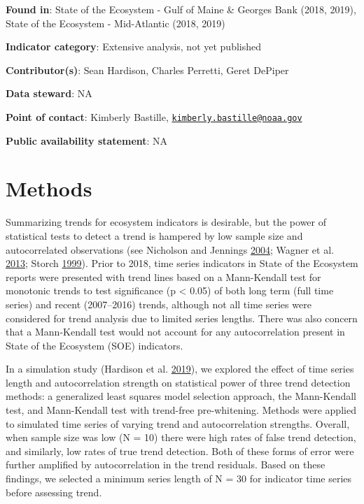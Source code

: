 \documentclass[
]{book}
\begin{document}
\textbf{Found in}: State of the Ecosystem - Gulf of Maine \& Georges Bank (2018, 2019), State of the Ecosystem - Mid-Atlantic (2018, 2019)

\textbf{Indicator category}: Extensive analysis, not yet published

\textbf{Contributor(s)}: Sean Hardison, Charles Perretti, Geret DePiper

\textbf{Data steward}: NA

\textbf{Point of contact}: Kimberly Bastille, \href{mailto:kimberly.bastille@noaa.gov}{\nolinkurl{kimberly.bastille@noaa.gov}}

\textbf{Public availability statement}: NA

\hypertarget{methods-43}{%
\section{Methods}\label{methods-43}}

Summarizing trends for ecosystem indicators is desirable, but the power of statistical tests to detect a trend is hampered by low sample size and autocorrelated observations (see Nicholson and Jennings \protect\hyperlink{ref-Nicholson2004}{2004}; Wagner et al. \protect\hyperlink{ref-Wagner2013}{2013}; Storch \protect\hyperlink{ref-VonStorch1999a}{1999}). Prior to 2018, time series indicators in State of the Ecosystem reports were presented with trend lines based on a Mann-Kendall test for monotonic trends to test significance (p \textless{} 0.05) of both long term (full time series) and recent (2007--2016) trends, although not all time series were considered for trend analysis due to limited series lengths. There was also concern that a Mann-Kendall test would not account for any autocorrelation present in State of the Ecosystem (SOE) indicators.

In a simulation study (Hardison et al. \protect\hyperlink{ref-hardison2019}{2019}), we explored the effect of time series length and autocorrelation strength on statistical power of three trend detection methods: a generalized least squares model selection approach, the Mann-Kendall test, and Mann-Kendall test with trend-free pre-whitening. Methods were applied to simulated time series of varying trend and autocorrelation strengths. Overall, when sample size was low (N = 10) there were high rates of false trend detection, and similarly, low rates of true trend detection. Both of these forms of error were further amplified by autocorrelation in the trend residuals. Based on these findings, we selected a minimum series length of N = 30 for indicator time series before assessing trend.
\end{document}
